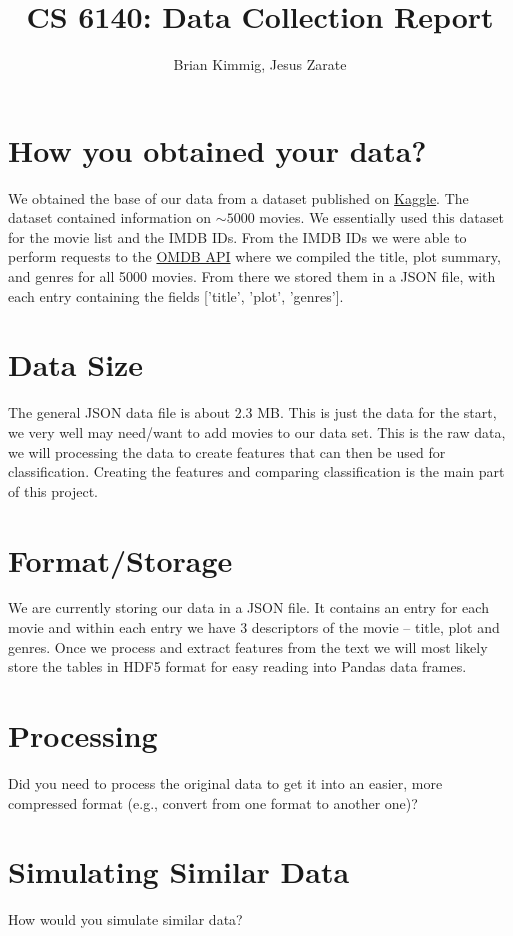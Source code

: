 \documentclass[12pt]{article}
\title{CS 6140: Data Collection Report}
\author{Brian Kimmig, Jesus Zarate}
\date{}
\begin{document}
\maketitle

\section{How you obtained your data?}

We obtained the base of our data from a dataset published on \href{https://www.kaggle.com/deepmatrix/imdb-5000-movie-dataset}{Kaggle}. The dataset contained information on $\sim5000$ movies. We essentially used this dataset for the movie list and the IMDB IDs. From the IMDB IDs we were able to perform requests to the  \href{https://www.omdbapi.com/}{OMDB API} where we compiled the title, plot summary, and genres for all 5000 movies. From there we stored them in a JSON file, with each entry containing the fields ['title', 'plot', 'genres'].

\section{Data Size}
The general JSON data file is about 2.3 MB. This is just the data for the start, we very well may need/want to add movies to our data set. This is the raw data, we will processing the data to create features that can then be used for classification. Creating the features and comparing classification is the main part of this project.

\section{Format/Storage}
We are currently storing our data in a JSON file. It contains an entry for each movie and within each entry we have 3 descriptors of the movie -- title, plot and genres. Once we process and extract features from the text we will most likely store the tables in HDF5 format for easy reading into Pandas data frames.

\section{Processing}
Did you need to process the original data to get it into an easier, more compressed format (e.g., convert from one format to another one)?

\section{Simulating Similar Data}
How would you simulate similar data?
\end{document}
